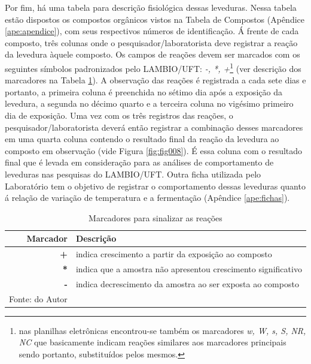 \documentclass[tcc2]{classe_uftex/uftex}
\begin{document}
Por fim, há uma tabela para descrição fisiológica dessas leveduras. Nessa tabela estão dispostos os compostos orgânicos vistos na Tabela de Compostos (Apêndice \ref{ape:apendice}), com seus respectivos números de identificação. Á frente de cada composto, três colunas onde o pesquisador/laboratorista deve registrar a reação da levedura àquele composto. Os campos de reações devem ser marcados com os seguintes símbolos padronizados pelo LAMBIO/UFT: \emph{-, *, +}\footnote{nas planilhas eletrônicas encontrou-se também os marcadores \emph{w, W, s, S, NR, NC} que basicamente indicam reações similares aos marcadores principais sendo portanto, substituídos pelos mesmos.} (ver descrição dos marcadores na Tabela \ref{tab:tabela03}). A observação das reações é registrada a cada sete dias e portanto, a primeira coluna é preenchida no sétimo dia após a exposição da levedura, a segunda no décimo quarto e a terceira coluna no vigésimo primeiro dia de exposição. Uma vez com os três registros das reações, o pesquisador/laboratorista deverá então registrar a combinação desses marcadores em uma quarta coluna contendo o resultado final da reação da levedura ao composto em observação (vide Figura \ref{fig:fig008}). É essa coluna com o resultado final que é levada em consideração para as análises de comportamento de leveduras nas pesquisas do LAMBIO/UFT. Outra ficha utilizada pelo Laboratório tem o objetivo de registrar o comportamento dessas leveduras quanto á relação de variação de temperatura e a fermentação (Apêndice \ref{ape:fichas}).

    \begin{table}%
    \centering
    \caption{\label{tab:tabela03} Marcadores para sinalizar as reações }
    \begin{tabular}[c]{rl}
    \hline
     \textbf{Marcador} & \textbf{Descrição} \\
     \hline
        \textbf{+} & indica crescimento a partir da exposição ao composto \\
        \textbf{*} & indica que a amostra não apresentou crescimento significativo \\
        \textbf{-} & indica decrescimento da amostra ao ser exposta ao composto \\
      \hline
     \raggedright \scriptsize \centering Fonte: do Autor
    \end{tabular}
    \end{table}
    

\end{document}
